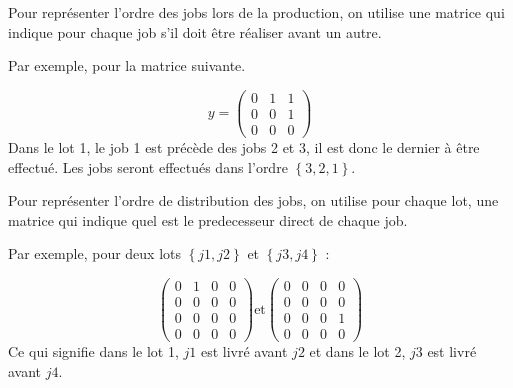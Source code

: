 \documentclass{article}
\begin{document}
        Pour représenter l’ordre des jobs lors de la production, on utilise une matrice qui indique pour chaque job s’il doit être réaliser avant un autre.
        
        Par exemple, pour la matrice suivante.

        $$
            y=
            \begin{pmatrix}
                0&1&1\\
                0&0&1\\
                0&0&0
            \end{pmatrix}
        $$
        Dans le lot 1, le job 1 est précède des jobs 2 et 3, il est donc le dernier à être effectué. Les jobs seront effectués dans l’ordre $\left\{3,2,1\right\}$.
        
        Pour représenter l'ordre de distribution des jobs, on utilise pour chaque lot, une matrice qui indique quel est le predecesseur direct de chaque job.
        
        Par exemple, pour deux lots $\left\{j1,j2\right\}$ et $\left\{ j3, j4\right\}$ :
        
        $$
            \begin{pmatrix}
                0&1&0&0\\
                0&0&0&0\\
                0&0&0&0\\
                0&0&0&0
            \end{pmatrix}
            \text{et}
            \begin{pmatrix}
                0&0&0&0\\
                0&0&0&0\\
                0&0&0&1\\
                0&0&0&0
            \end{pmatrix}
        $$
        Ce qui signifie dans le lot 1, $j1$ est livré avant $j2$ et dans le lot 2, $j3$ est livré avant $j4$.
        
\end{document}
